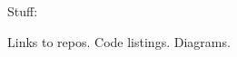 Stuff:

\begin{itemize}
    \hitem Links to repos.
    \hitem Code listings.
    \hitem Diagrams.
\end{itemize}